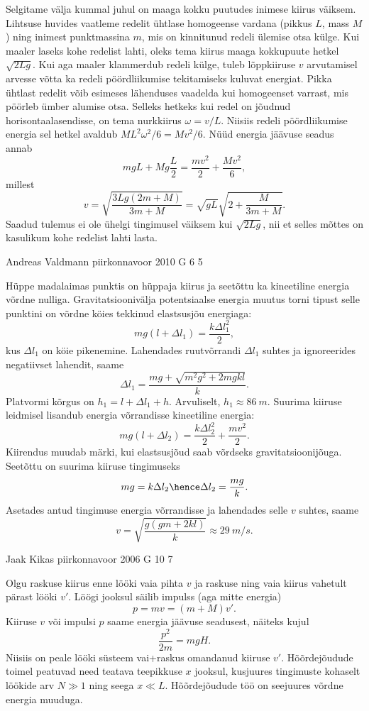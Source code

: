 \documentclass[11pt]{article}
\begin{document}
{{\ifSolution
Selgitame välja kummal juhul on maaga kokku puutudes inimese kiirus väiksem. Lihtsuse huvides vaatleme redelit ühtlase
homogeense vardana (pikkus $L$, mass $M$) ning inimest punktmassina $m$, mis on kinnitunud redeli ülemise otsa külge. Kui maaler laseks kohe redelist lahti, oleks tema kiirus maaga kokkupuute hetkel $\sqrt{2Lg}$. Kui aga maaler klammerdub redeli külge, tuleb lõppkiiruse $v$ arvutamisel arvesse võtta ka redeli pöördliikumise tekitamiseks kuluvat energiat. Pikka ühtlast redelit võib esimeses lähenduses vaadelda kui homogeenset varrast, mis pöörleb ümber alumise otsa. Selleks hetkeks kui redel on jõudnud horisontaalasendisse, on tema nurkkiirus $\omega=v/L$. Niisiis redeli pöördliikumise energia sel hetkel avaldub $ML^2\omega^2/6=Mv^2/6$. Nüüd energia jäävuse seadus annab
\[
mgL+Mg\frac{L}{2}=\frac{mv^2}{2} +\frac{Mv^2}{6},
\]
millest
\[
v=\sqrt{\frac{3Lg(2m+M)}{3m+M}}=\sqrt{gL}\sqrt{2+\frac{M}{3m+M}}.
\]
Saadud tulemus ei ole ühelgi tingimusel väiksem kui $\sqrt{2Lg}$, nii et selles mõttes on kasulikum kohe redelist lahti lasta.
\fi
}

{Andreas Valdmann} %
{piirkonnavoor} %
{2010} %
{G 6} %
{5} %
{

\ifSolution
Hüppe madalaimas punktis on hüppaja kiirus ja seetõttu ka kineetiline energia võrdne nulliga. Gravitatsioonivälja potentsiaalse energia muutus torni tipust selle punktini on võrdne köies tekkinud elastsusjõu energiaga:
\[
mg(l+\Delta l_1)=\frac{k\Delta l_1^2}{2},
\]
kus $\Delta l_1$ on köie pikenemine. Lahendades ruutvõrrandi $\Delta l_1$ suhtes ja ignoreerides negatiivset lahendit, saame
\[
\Delta l_1=\frac{mg+\sqrt{m^2g^2+2mgkl}}{k}.
\]
Platvormi kõrgus on $h_1=l+\Delta l_1+h$.
Arvuliselt, $h_1\approx \SI{86}{m}$.
Suurima kiiruse leidmisel lisandub energia võrrandisse kineetiline energia:
\[
mg(l+\Delta l_2)=\frac{k\Delta l_2^2}{2}+\frac{mv^2}{2}.
\]
Kiirendus muudab märki, kui elastsusjõud saab võrdseks gravitatsioonijõuga. Seetõttu on suurima kiiruse tingimuseks
\[
mg=k\Delta l_2 \hence \Delta l_2=\frac{mg}{k}.
\]
Asetades antud tingimuse energia võrrandisse ja lahendades selle $v$ suhtes, saame
\[
v=\sqrt{\frac{g(gm+2kl)}{k}} \approx \SI{29}{m/s}.
\]
\fi
}

{Jaak Kikas} %
{piirkonnavoor} %
{2006} %
{G 10} %
{7} %
{

\ifSolution
Olgu raskuse kiirus enne lööki vaia pihta $v$ ja raskuse ning vaia kiirus vahetult
pärast lööki $v'$. Löögi jooksul säilib impulss (aga mitte energia) 
\[
p = mv = (m + M)v'.
\] 
Kiiruse $v$ või impulsi $p$ saame energia jäävuse seadusest, näiteks kujul
\[
\frac{p^2}{2m} = mgH.
\]
Niisiis on peale lööki süsteem vai+raskus omandanud kiiruse $v'$. Hõõrdejõudude toimel peatuvad need teatava teepikkuse $x$ jooksul, kusjuures tingimuste kohaselt löökide arv $N \gg 1$ ning seega $x \ll L$. Hõõrdejõudude töö on seejuures võrdne energia muuduga.

}}
\end{document}
